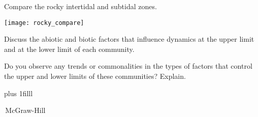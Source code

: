 \documentclass[t]{beamer}
\begin{document}
\begin{frame}[t]{Compare the rocky intertidal and subtidal zones.}

\vspace*{-\baselineskip}

\begin{multicols}{2}

	\vspace*{-\baselineskip}
	\begin{center}
		\texttt{[image: rocky\_compare]}
	\end{center}

\columnbreak

	\hangpara Discuss the abiotic and biotic factors that influence dynamics at the upper limit and at the lower limit of each community. 
	

	\hangpara Do you observe any trends or commonalities in the types of factors that control the upper and lower limits of these communities? Explain.

\end{multicols}

	\vskip0pt plus 1filll

	\tiny\textcopyright\,McGraw-Hill

\end{frame}
\end{document}
